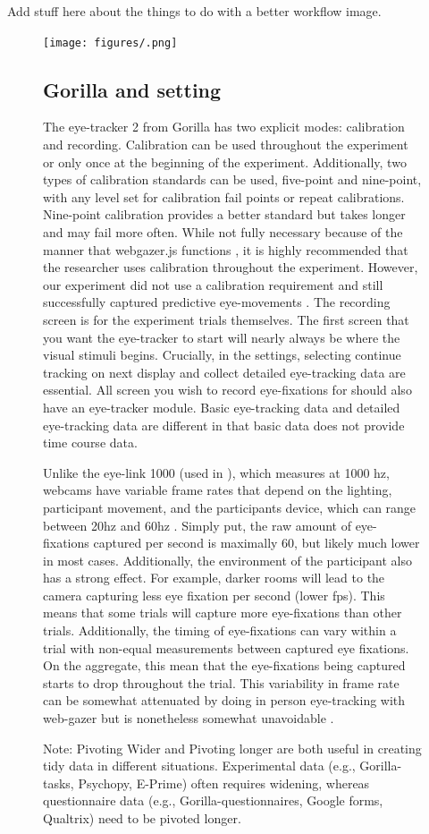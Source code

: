 Add stuff here about the things to do with a better workflow image. 

\begin{figure}[h]
    \centering
    \texttt{[image: figures/.png]}
    \caption{Note: Pivoting Wider and Pivoting longer are both useful in creating tidy data in different situations. Experimental data (e.g., Gorilla-tasks, Psychopy, E-Prime) often requires widening, whereas questionnaire data (e.g., Gorilla-questionnaires, Google forms, Qualtrix) need to be pivoted longer.}
    \label{fig:pivoting}


\subsection{Gorilla and setting}

The eye-tracker 2 from Gorilla has two explicit modes: calibration and recording. Calibration can be used throughout the experiment or only once at the beginning of the experiment. Additionally, two types of calibration standards can be used, five-point and nine-point, with any level set for calibration fail points or repeat calibrations. Nine-point calibration provides a better standard but takes longer and may fail more often. While not fully necessary because of the manner that webgazer.js functions \parencite[e.g.,][]{ Chen_et_al_2001}, it is highly recommended that the researcher uses calibration throughout the experiment. However, our experiment did not use a calibration requirement and still successfully captured predictive eye-movements \parencite[][]{Prystauka_Altmann_Rothman_2023}. The recording screen is for the experiment trials themselves. The first screen that you want the eye-tracker to start will nearly always be where the visual stimuli begins. Crucially, in the settings, selecting continue tracking on next display and collect detailed eye-tracking data are essential. All screen you wish to record eye-fixations for should also have an eye-tracker module. Basic eye-tracking data and detailed eye-tracking data are different in that basic data does not provide time course data. 

Unlike the eye-link 1000 (used in \parencite{Porretta_et_al_2020}), which measures at 1000 hz, webcams have variable frame rates that depend on the lighting, participant movement, and the participants device, which can range between 20hz and 60hz \parencite{Vos_2017}. Simply put, the raw amount of eye-fixations captured per second is maximally 60, but likely much lower in most cases. Additionally, the environment of the participant also has a strong effect. For example, darker rooms will lead to the camera capturing less eye fixation per second (lower fps). This means that some trials will capture more eye-fixations than other trials. \parencite{} Additionally, the timing of eye-fixations can vary within a trial with non-equal measurements between captured eye fixations. On the aggregate, this mean that the eye-fixations being captured starts to drop throughout the trial. This variability in frame rate can be somewhat attenuated by doing in person eye-tracking with web-gazer but is nonetheless somewhat unavoidable \parencite[e.g.,][]{}{}{}. 


\end{figure}
